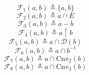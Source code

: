 $$\mathcal{F}_1(a, b) \triangleq \{a, b\}$$
$$\mathcal{F}_2(a, b) \triangleq a \cap E$$
$$\mathcal{F}_3(a, b) \triangleq a - b$$
$$\mathcal{F}_4(a, b) \triangleq a \upharpoonright b$$
$$\mathcal{F}_5(a, b) \triangleq a \cap \mathcal{D}(b)$$
$$\mathcal{F}_6(a, b) \triangleq a \cap b^{-1}$$
$$\mathcal{F}_7(a, b) \triangleq a \cap \mathrm{Cnv}_2(b)$$
$$\mathcal{F}_8(a, b) \triangleq a \cap \mathrm{Cnv}_3(b)$$

